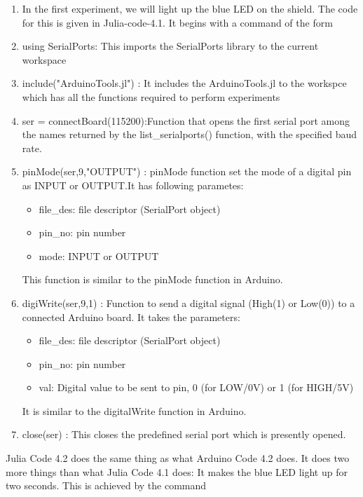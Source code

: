 \begin{enumerate}
\item In the first experiment, we will light up the blue LED on the
  shield.  The code for this is given in Julia-code-4.1.
    It begins with a command of the form

\item using SerialPorts: This imports the SerialPorts library to the current workspace
\item include("ArduinoTools.jl") : It includes the ArduinoTools.jl to the workspce which has all the functions required to perform experiments 
\item ser = connectBoard(115200):Function that opens the first serial port among the names returned by the
list\_serialports() function, with the specified baud rate.
 
\item pinMode(ser,9,"OUTPUT") : pinMode function set the mode of a digital pin as INPUT or OUTPUT.It has following parametes:
      \begin{itemize}
        \item file\_des: file descriptor (SerialPort object)
        \item pin\_no: pin number
        \item mode: INPUT or OUTPUT
      \end{itemize}
 This function is similar to the pinMode function in Arduino.


\item digiWrite(ser,9,1) : Function to send a digital signal (High(1) or Low(0)) to a connected Arduino
board. It takes the parameters:

\begin{itemize}
\item file\_des: file descriptor (SerialPort object)
\item pin\_no: pin number
\item val: Digital value to be sent to pin, 0 (for LOW/0V) or 1 (for HIGH/5V)
\end{itemize}
It is similar to the digitalWrite function in Arduino.
 
\item close(ser) : This closes the predefined serial port which is presently opened.
\end{enumerate}

Julia Code 4.2 does the same thing as what Arduino Code 4.2 does. It does
two more things than what Julia Code 4.1 does: It makes the blue LED light
up for two seconds. This is achieved by the command

